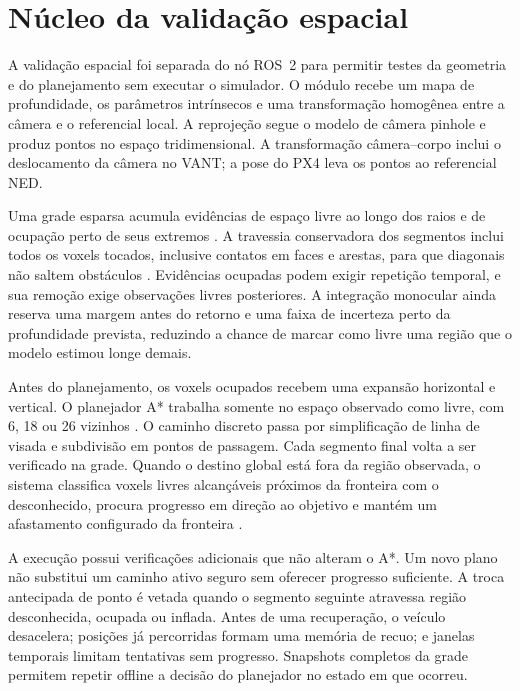 \section{Núcleo da validação espacial}

A validação espacial foi separada do nó ROS~2 para permitir testes da geometria e do planejamento sem executar o simulador. O módulo recebe um mapa de profundidade, os parâmetros intrínsecos e uma transformação homogênea entre a câmera e o referencial local. A reprojeção segue o modelo de câmera pinhole e produz pontos no espaço tridimensional. A transformação câmera--corpo inclui o deslocamento da câmera no VANT; a pose do PX4 leva os pontos ao referencial NED.

Uma grade esparsa acumula evidências de espaço livre ao longo dos raios e de ocupação perto de seus extremos \cite{Elfes1989,Hornung2013}. A travessia conservadora dos segmentos inclui todos os voxels tocados, inclusive contatos em faces e arestas, para que diagonais não saltem obstáculos \cite{AmanatidesWoo1987}. Evidências ocupadas podem exigir repetição temporal, e sua remoção exige observações livres posteriores. A integração monocular ainda reserva uma margem antes do retorno e uma faixa de incerteza perto da profundidade prevista, reduzindo a chance de marcar como livre uma região que o modelo estimou longe demais.

Antes do planejamento, os voxels ocupados recebem uma expansão horizontal e vertical. O planejador A* trabalha somente no espaço observado como livre, com 6, 18 ou 26 vizinhos \cite{Hart1968}. O caminho discreto passa por simplificação de linha de visada e subdivisão em pontos de passagem. Cada segmento final volta a ser verificado na grade. Quando o destino global está fora da região observada, o sistema classifica voxels livres alcançáveis próximos da fronteira com o desconhecido, procura progresso em direção ao objetivo e mantém um afastamento configurado da fronteira \cite{Yamauchi1997}.

A execução possui verificações adicionais que não alteram o A*. Um novo plano não substitui um caminho ativo seguro sem oferecer progresso suficiente. A troca antecipada de ponto é vetada quando o segmento seguinte atravessa região desconhecida, ocupada ou inflada. Antes de uma recuperação, o veículo desacelera; posições já percorridas formam uma memória de recuo; e janelas temporais limitam tentativas sem progresso. Snapshots completos da grade permitem repetir offline a decisão do planejador no estado em que ocorreu.

